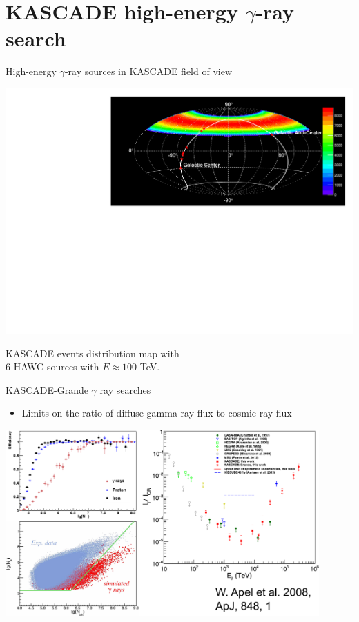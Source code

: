 \section{KASCADE high-energy \texorpdfstring{$\gamma$}{gamma}-ray search}

\begin{frame}{High-energy $\gamma$-ray sources in KASCADE field of view}
  
  \begin{center}
    \includegraphics[width=1\textwidth]{pics/Skymap_6srcs.pdf}
    
 KASCADE events distribution map
  with\\ 6 HAWC sources with $E \approx 100$ TeV.
\end{center}
\end{frame}

\begin{frame}{KASCADE-Grande $\gamma$ ray searches}
\begin{itemize}
 \item Limits on the ratio of diffuse gamma-ray flux to cosmic ray flux
\end{itemize}

\begin{center}
    \includegraphics[width=0.90\textwidth]{pics/KASCADE-Grande_UHECR2016.pdf}
\end{center}
\end{frame}

